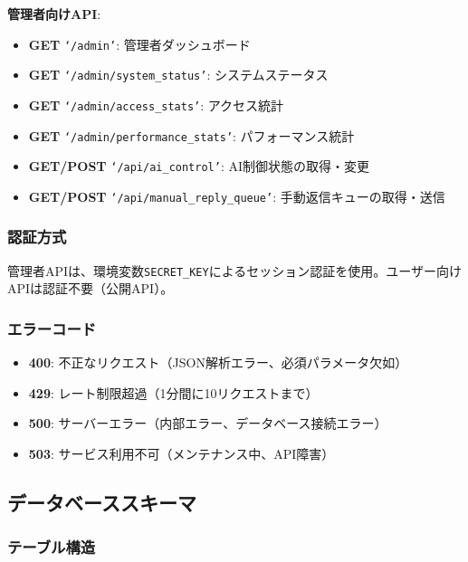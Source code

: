 \documentclass[a4paper,11pt,ja=standard,xelatex]{bxjsarticle}
\theoremstyle{definition}
\begin{document}
\textbf{管理者向けAPI}:
\begin{itemize}
\item \textbf{GET} \texttt{`/admin'}: 管理者ダッシュボード
\item \textbf{GET} \texttt{`/admin/system\_status'}: システムステータス
\item \textbf{GET} \texttt{`/admin/access\_stats'}: アクセス統計
\item \textbf{GET} \texttt{`/admin/performance\_stats'}: パフォーマンス統計
\item \textbf{GET/POST} \texttt{`/api/ai\_control'}: AI制御状態の取得・変更
\item \textbf{GET/POST} \texttt{`/api/manual\_reply\_queue'}: 手動返信キューの取得・送信
\end{itemize}

\subsubsection{認証方式}

管理者APIは、環境変数\texttt{SECRET\_KEY}によるセッション認証を使用。ユーザー向けAPIは認証不要（公開API）。

\subsubsection{エラーコード}

\begin{itemize}
\item \textbf{400}: 不正なリクエスト（JSON解析エラー、必須パラメータ欠如）
\item \textbf{429}: レート制限超過（1分間に10リクエストまで）
\item \textbf{500}: サーバーエラー（内部エラー、データベース接続エラー）
\item \textbf{503}: サービス利用不可（メンテナンス中、API障害）
\end{itemize}

\subsection{データベーススキーマ}

\subsubsection{テーブル構造}
\end{document}
